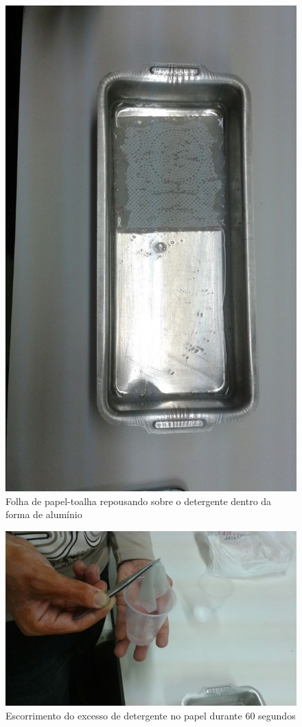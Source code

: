 \documentclass[a4paper,12pt,notitlepage]{article}
\begin{document}
\begin{figure}
    \centering
    \includegraphics[scale = 0.3]{foto3}
    \caption{Folha de papel-toalha repousando sobre o detergente dentro da forma de alumínio}
    \label{fig:foto3}
\end{figure}

\begin{figure}
    \centering
    \includegraphics[width=\textwidth]{foto4}
    \caption{Escorrimento do excesso de detergente no papel durante 60 segundos}
    \label{fig:foto4}
\end{figure}
\end{document}

